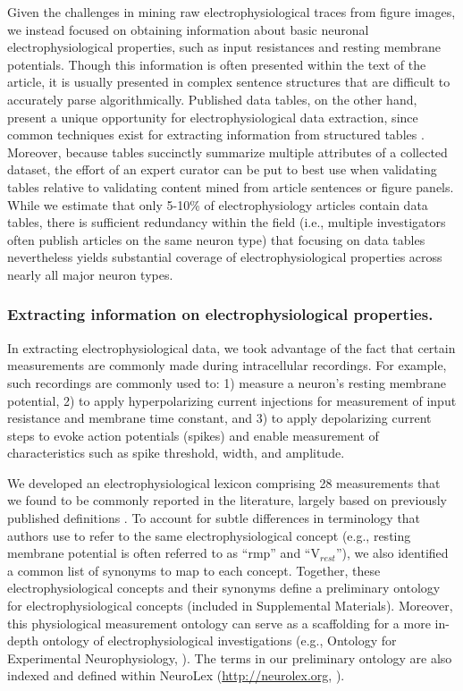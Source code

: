 \documentclass{template/frontiersSCNS} %
\begin{document}
Given the challenges in mining raw electrophysiological traces from figure images, we instead focused on obtaining information about basic neuronal electrophysiological properties, such as input resistances and resting membrane potentials.  
Though this information is often presented within the text of the article, it is usually presented in complex sentence structures that are difficult to accurately parse algorithmically.  
Published data tables, on the other hand, present a unique opportunity for electrophysiological data extraction, since common techniques exist for extracting information from structured tables \citep{yarkoni_large-scale_2011}.  
Moreover, because tables succinctly summarize multiple attributes of a collected dataset, the effort of an expert curator can be put to best use when validating tables relative to validating content mined from article sentences or figure panels.  
While we estimate that only 5-10\% of electrophysiology articles contain data tables, there is sufficient redundancy within the field (i.e., multiple investigators often publish articles on the same neuron type) that focusing on data tables nevertheless yields substantial coverage of electrophysiological properties across nearly all major neuron types.

\subsubsection{Extracting information on electrophysiological properties.}
\label{sec:ephys_extraction}
In extracting electrophysiological data, we took advantage of the fact that certain measurements are commonly made during intracellular recordings.  
For example, such recordings are commonly used to: 
1) measure a neuron's resting membrane potential, 
2) to apply hyperpolarizing current injections for measurement of input resistance and membrane time constant, and 
3) to apply depolarizing current steps to evoke action potentials (spikes) and enable measurement of characteristics such as spike threshold, width, and amplitude.

We developed an electrophysiological lexicon comprising 28 measurements that we found to be commonly reported in the literature, largely based on previously published definitions \citep{toledo-rodriguez_correlation_2004,ascoli_petilla_2008}.  
To account for subtle differences in terminology that authors use to refer to the same electrophysiological concept (e.g., resting membrane potential is often referred to as ``rmp'' and ``V$_{rest}$''), we also identified a common list of synonyms to map to each concept.  
Together, these electrophysiological concepts and their synonyms define a preliminary ontology for electrophysiological concepts (included in Supplemental Materials).  
Moreover, this physiological measurement ontology can serve as a scaffolding for a more in-depth ontology of electrophysiological investigations (e.g., Ontology for Experimental Neurophysiology, \citet{bruha_ontology_2013}). 
The terms in our preliminary ontology are also indexed and defined within NeuroLex (\url{http://neurolex.org}, \citep{larson_neurolex.org:_2013}).   
  
\end{document}
